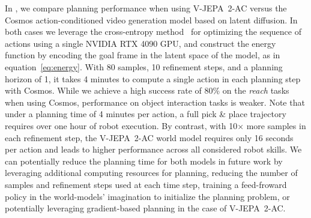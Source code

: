 \documentclass[]{fairmeta}
\newcommand{\acModel}{V-JEPA~2-AC\xspace}
\begin{document}
In , we compare planning performance when using \acModel versus the Cosmos action-conditioned video generation model based on latent diffusion.
In both cases we leverage the cross-entropy method~\citep{rubinstein1997optimization} for optimizing the sequence of actions using a single NVIDIA RTX 4090 GPU, and construct the energy function by encoding the goal frame in the latent space of the model, as in equation~\eqref{eq:energy}.
With 80 samples, 10 refinement steps, and a planning horizon of 1, it takes 4 minutes to compute a single action in each planning step with Cosmos.
While we achieve a high success rate of 80\% on the \emph{reach} tasks when using Cosmos, performance on object interaction tasks is weaker.
Note that under a planning time of 4 minutes per action, a full pick \& place trajectory requires over one hour of robot execution.
By contrast, with 10$\times$ more samples in each refinement step, the \acModel world model requires only 16 seconds per action and leads to higher performance across all considered robot skills.
We can potentially reduce the planning time for both models in future work by leveraging additional computing resources for planning, reducing the number of samples and refinement steps used at each time step, training a feed-froward policy in the world-models' imagination to initialize the planning problem, or potentially leveraging gradient-based planning in the case of \acModel.
    
\end{document}
